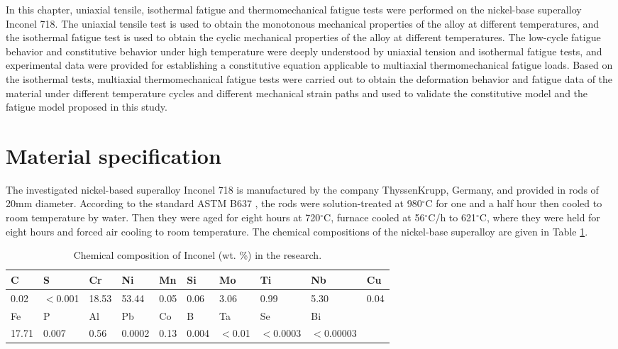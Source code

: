 In this chapter, uniaxial tensile, isothermal fatigue and thermomechanical fatigue tests were performed on the nickel-base superalloy Inconel 718. The uniaxial tensile test is used to obtain the monotonous mechanical properties of the alloy at different temperatures, and the isothermal fatigue test is used to obtain the cyclic mechanical properties of the alloy at different temperatures. The low-cycle fatigue behavior and constitutive behavior under high temperature were deeply understood by uniaxial tension and isothermal fatigue tests, and experimental data were provided for establishing a constitutive equation applicable to multiaxial thermomechanical fatigue loads. Based on the isothermal tests, multiaxial thermomechanical fatigue tests were carried out to obtain the deformation behavior and fatigue data of the material under different temperature cycles and different mechanical strain paths and used to validate the constitutive model and the fatigue model proposed in this study.

\section{Material specification}
\noindent
The investigated nickel-based superalloy Inconel 718 is manufactured by the company ThyssenKrupp, Germany, and provided in rods of 20mm diameter. According to the standard ASTM B637 \cite{ASTMB63716}, the rods were solution-treated at 980$^{\circ}$C for one and a half hour then cooled to room temperature by water. Then they were aged for eight hours at 720$^{\circ}$C, furnace cooled at 56$^{\circ}$C/h to 621$^{\circ}$C, where they were held for eight hours and forced air cooling to room temperature.
The chemical compositions of the nickel-base superalloy are given in Table \ref{Tab:ChemicalCompositionofIN718}.

\begin{table}[htbp]
  \centering
  \caption{Chemical composition of Inconel (wt. \%) in the research.}
    \begin{tabular}{llllllllll}
    \toprule
    C     & S     & Cr    & Ni    & Mn    & Si    & Mo    & Ti    & Nb    & Cu \\
    \midrule
    0.02  & $<$0.001 & 18.53 & 53.44 & 0.05  & 0.06  & 3.06  & 0.99  & 5.30  & 0.04 \\
    \midrule
    Fe    & P     & Al    & Pb    & Co    & B     & Ta    & Se    & Bi    &  \\
    \midrule
    17.71 & 0.007 & 0.56  & 0.0002 & 0.13  & 0.004 & $<$0.01 & $<$0.0003 & $<$0.00003 &  \\
    \bottomrule
    \end{tabular}%
  \label{Tab:ChemicalCompositionofIN718}%
\end{table}%

